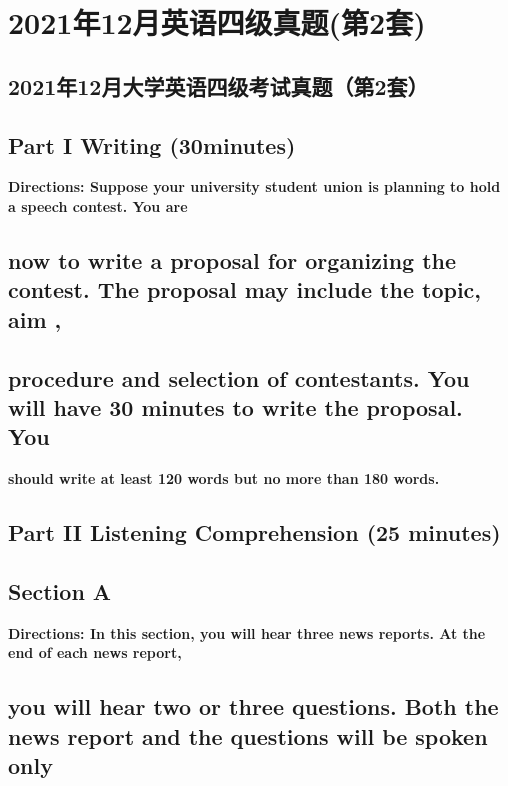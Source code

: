 \documentclass[UTF8,11pt]{ctexart}
\begin{document}
\section*{2021年12月英语四级真题(第2套)}
\subsection*{\textbf{2021年12月大学英语四级考试真题（第2套）}}


\subsection*{\textbf{Part I} \textbf{Writing} \textbf{(30minutes)}}


\textbf{Directions: Suppose your university student union is planning to hold a speech contest. You are}


\subsection*{\textbf{now to write a proposal for organizing the contest. The proposal may include the topic, aim ,}}


\subsection*{\textbf{procedure and selection of contestants. You will have 30 minutes to write the proposal. You}}


\textbf{should write at least 120 words but no more than 180 words.}


\subsection*{\textbf{Part II} \textbf{Listening Comprehension} \textbf{(25 minutes)}}


\subsection*{\textbf{Section A}}


\textbf{Directions: In this section, you will hear three news reports. At the end of each news report,}


\subsection*{\textbf{you will hear two or three questions. Both the news report and the questions will be spoken only}}
\end{document}
